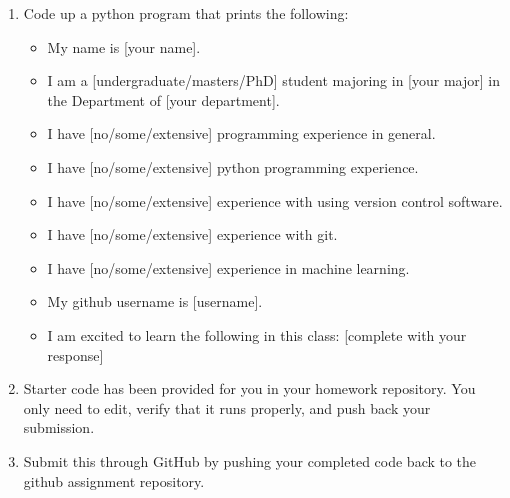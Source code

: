 \documentclass[11pt]{amsart}
\begin{document}
\begin{enumerate}
\item Code up a python program that prints the following:

\begin{itemize}
\item My name is [your name].
\item I am a [undergraduate/masters/PhD] student majoring in [your major] in the Department of [your department].
\item I have [no/some/extensive] programming experience in general.
\item I have [no/some/extensive] python programming experience.
\item I have [no/some/extensive] experience with using version control software. 
\item I have [no/some/extensive] experience with git.
\item I have [no/some/extensive] experience in machine learning.
\item My github username is [username].
\item I am excited to learn the following in this class: [complete with your response]
\end{itemize}
\item Starter code has been provided for you in your homework repository.  You only need to edit, verify that it runs properly, and push back your submission. 
\item Submit this through GitHub by pushing your completed code back to the github assignment repository. 
\end{enumerate}
\end{document}
